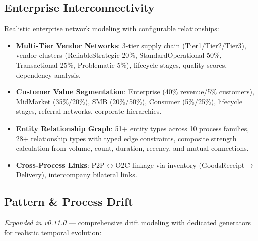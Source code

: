 \documentclass[11pt,a4paper]{article}
\begin{document}
\subsection{Enterprise Interconnectivity}

Realistic enterprise network modeling with configurable relationships:

\begin{itemize}[leftmargin=1.4em, itemsep=2pt]
  \item \textbf{Multi-Tier Vendor Networks}: 3-tier supply chain (Tier1/Tier2/Tier3), vendor clusters (ReliableStrategic 20\%, StandardOperational 50\%, Transactional 25\%, Problematic 5\%), lifecycle stages, quality scores, dependency analysis.
  \item \textbf{Customer Value Segmentation}: Enterprise (40\% revenue/5\% customers), MidMarket (35\%/20\%), SMB (20\%/50\%), Consumer (5\%/25\%), lifecycle stages, referral networks, corporate hierarchies.
  \item \textbf{Entity Relationship Graph}: 51+ entity types across 10 process families, 28+ relationship types with typed edge constraints, composite strength calculation from volume, count, duration, recency, and mutual connections.
  \item \textbf{Cross-Process Links}: P2P$\leftrightarrow$O2C linkage via inventory (GoodsReceipt$\to$Delivery), intercompany bilateral links.
\end{itemize}

\subsection{Pattern \& Process Drift}

\textit{Expanded in v0.11.0} --- comprehensive drift modeling with dedicated generators
for realistic temporal evolution:
\end{document}
